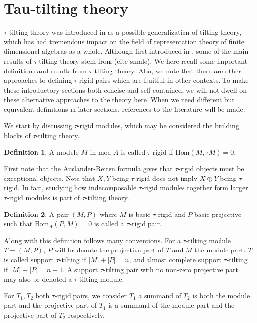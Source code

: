 \documentclass[]{article}
\theoremstyle{definition}
\newtheorem{definition}{Definition}[section]
\newcommand{\mo}{\ensuremath{\text{mod }}}
\newcommand{\Hom}{\ensuremath{\text{Hom}}}
\newcommand{\tu}{\ensuremath{\tau}}
\begin{document}
\section{Tau-tilting theory}
$\tau$-tilting theory was introduced in \cite{tau} as a possible generalization of tilting theory, which has had tremendous impact on the field of representation theory of finite dimensional algebras as a whole. Although first introduced in \cite{tau}, some of the main results of $\tau$-tilting theory stem from (cite smalø). We here recall some important definitions and results from $\tau$-tilting theory. Also, we note that there are other approaches to defining \tu-rigid pairs which are fruitful in other contexts. To make these introductory sections both concise and self-contained, we will not dwell on these alternative approaches to the theory here.  When we need different but equivalent definitions in later sections, references to the literature will be made.

We start by discussing $\tau$-rigid modules, which may be considered the building blocks of $\tau$-tilting theory. 


\begin{definition}
	A module $M$ in $\mo A$ is called $\tau$-rigid if $\Hom(M,\tau M) = 0$.
\end{definition}

First note that the Auslander-Reiten formula gives that \tu-rigid objects must be exceptional objects. Note that $X,Y$ being $\tau$-rigid does not imply $X \oplus Y$ being $\tau$-rigid. In fact, studying how indecomposable $\tau$-rigid modules together form larger $\tau$-rigid modules is part of $\tau$-tilting theory.

\begin{definition}\cite[Definition 0.3]{tau}
	A pair $(M,P)$ where $M$ is basic $\tau$-rigid and $P$ basic projective such that $\Hom_A(P,M) = 0$ is called a  $\tau$-rigid pair.
\end{definition}

Along with this definition follows many conventions. For a  $\tau$-tilting module $T = (M,P)$, $P$ will be denote the projective part of $T$ and $M$ the module part. $T$ is called support \tu-tilting if $|M| + |P| = n$, and almost complete support \tu-tilting if $|M| + |P| = n - 1$. A support \tu-tilting pair with no non-zero projective part may also be denoted a \tu-tilting module. 

For $T_1,T_2$ both \tu-rigid pairs, we consider $T_1$ a summand of $T_2$ is both the module part and the projective part of $T_1$ is a summand of the module part and the projective part of $T_2$ respectively.
\end{document}
